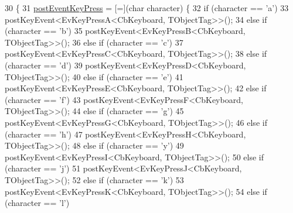 \begin{DoxyCode}
30         \{
31                 \hyperlink{classsm__three__some_1_1CbKeyboard_a746c413234e920c55625d63f4a6be784}{postEventKeyPress} = [=](\textcolor{keywordtype}{char} character) \{
32                         \textcolor{keywordflow}{if} (character == \textcolor{charliteral}{'a'})
33                                 postKeyEvent<EvKeyPressA<CbKeyboard, TObjectTag>>();
34                         \textcolor{keywordflow}{else} \textcolor{keywordflow}{if} (character == \textcolor{charliteral}{'b'})
35                                 postKeyEvent<EvKeyPressB<CbKeyboard, TObjectTag>>();
36                         \textcolor{keywordflow}{else} \textcolor{keywordflow}{if} (character == \textcolor{charliteral}{'c'})
37                                 postKeyEvent<EvKeyPressC<CbKeyboard, TObjectTag>>();
38                         \textcolor{keywordflow}{else} \textcolor{keywordflow}{if} (character == \textcolor{charliteral}{'d'})
39                                 postKeyEvent<EvKeyPressD<CbKeyboard, TObjectTag>>();
40                         \textcolor{keywordflow}{else} \textcolor{keywordflow}{if} (character == \textcolor{charliteral}{'e'})
41                                 postKeyEvent<EvKeyPressE<CbKeyboard, TObjectTag>>();
42                         \textcolor{keywordflow}{else} \textcolor{keywordflow}{if} (character == \textcolor{charliteral}{'f'})
43                                 postKeyEvent<EvKeyPressF<CbKeyboard, TObjectTag>>();
44                         \textcolor{keywordflow}{else} \textcolor{keywordflow}{if} (character == \textcolor{charliteral}{'g'})
45                                 postKeyEvent<EvKeyPressG<CbKeyboard, TObjectTag>>();
46                         \textcolor{keywordflow}{else} \textcolor{keywordflow}{if} (character == \textcolor{charliteral}{'h'})
47                                 postKeyEvent<EvKeyPressH<CbKeyboard, TObjectTag>>();
48                         \textcolor{keywordflow}{else} \textcolor{keywordflow}{if} (character == \textcolor{charliteral}{'y'})
49                                 postKeyEvent<EvKeyPressI<CbKeyboard, TObjectTag>>();
50                         \textcolor{keywordflow}{else} \textcolor{keywordflow}{if} (character == \textcolor{charliteral}{'j'})
51                                 postKeyEvent<EvKeyPressJ<CbKeyboard, TObjectTag>>();
52                         \textcolor{keywordflow}{else} \textcolor{keywordflow}{if} (character == \textcolor{charliteral}{'k'})
53                                 postKeyEvent<EvKeyPressK<CbKeyboard, TObjectTag>>();
54                         \textcolor{keywordflow}{else} \textcolor{keywordflow}{if} (character == \textcolor{charliteral}{'l'})

\end{DoxyCode}
